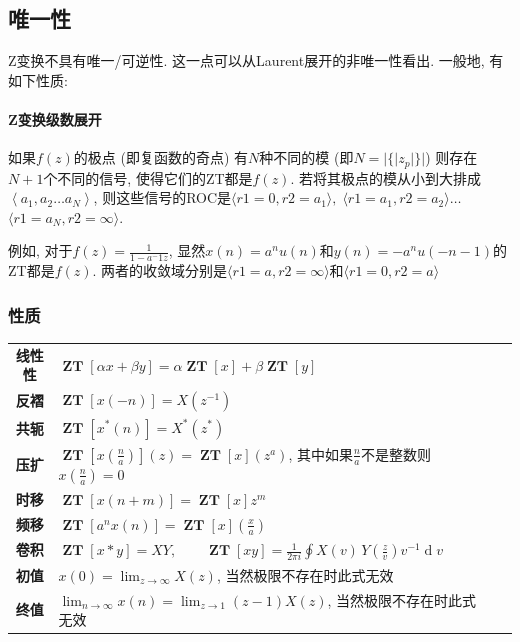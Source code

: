 \documentclass{ctexart}
\DeclareMathOperator{\ZT}{\mathbf{ZT}}
\DeclareMathOperator{\ud}{\mathrm{d}}
\begin{document}
\subsection{唯一性}
    Z变换不具有唯一/可逆性. 这一点可以从Laurent展开的非唯一性看出.
    一般地, 有如下性质:
\paragraph{Z变换级数展开}
    如果$f(z)$的极点 (即复函数的奇点) 有$N$种不同的模 (即$N=|\{|z_p|\}|$) 则存在$N+1$个不同的信号, 使得它们的ZT都是$f(z)$.
    若将其极点的模从小到大排成$\left\langle a_1, a_2\ldots a_N\right\rangle$,
    则这些信号的ROC是$\langle r1=0, r2=a_1 \rangle,\;$$\langle r1=a_1, r2=a_2\rangle\ldots$
    $\langle r1=a_N, r2=\infty\rangle$.\par
    例如, 对于$f(z) = \frac{1}{1- a^-1z}$, 显然$x(n) = a^n u(n)$和$y(n) = -a^n u(-n-1)$的ZT都是$f(z)$.
    两者的收敛域分别是$\langle r1=a, r2=\infty\rangle$和$\langle r1=0, r2=a\rangle$
\subsubsection{性质}
    \begin{center}
    \begin{tabularx}{\textwidth}{>{\bfseries}Sl  SL}
        线性性 &  $\displaystyle \ZT[\alpha x + \beta y] = \alpha \ZT[x] + \beta \ZT[y]$\\
        反褶 & $\displaystyle \ZT[x(-n)] = X(z^{-1})$\\
        共轭 & $\displaystyle \ZT[x^*(n)] = X^*(z^*)$\\
        压扩 & $\displaystyle \ZT\left[x(\frac{n}{a})\right](z) = \ZT[x](z^a)$, 其中如果$\frac{n}{a}$不是整数则$x(\frac{n}{a}) = 0$\\
        时移 & $\displaystyle \ZT[x(n + m)] = \ZT[x]z^m$\\
        频移 & $\displaystyle \ZT[a^n x(n)] = \ZT[x]\left(\frac{x}{a}\right)$\\
        卷积 & $\displaystyle \ZT[x * y] = X Y,\qquad \ZT[x y] = \frac{1}{2 \pi i} \oint X(v) \,Y\!\left( \frac{z}{v} \right) v^{-1}\ud v  $\\
        初值 & $\displaystyle x(0) = \lim_{z \to \infty} X(z)$, 当然极限不存在时此式无效\\
        终值 & $\displaystyle \lim_{n \to \infty} x(n) = \lim_{z \to 1} (z - 1) X(z)$, 当然极限不存在时此式无效\\
    \end{tabularx}
    \end{center}
\end{document}
